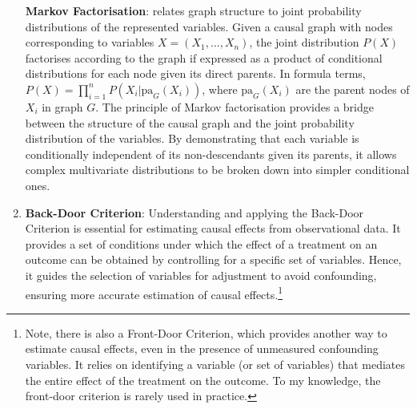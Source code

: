 \documentclass[
  singlecolumn]{report}
\begin{document}
\begin{enumerate}
  \textbf{Markov Factorisation}: relates graph structure to joint
  probability distributions of the represented variables. Given a causal
  graph with nodes corresponding to variables \(X = (X_1, ..., X_n)\),
  the joint distribution \(P(X)\) factorises according to the graph if
  expressed as a product of conditional distributions for each node
  given its direct parents. In formula terms,
  \(P(X) = \prod_{i=1}^{n} P(X_i | \text{pa}_G(X_i))\), where
  \(\text{pa}_G(X_i)\) are the parent nodes of \(X_i\) in graph \(G\).
  The principle of Markov factorisation provides a bridge between the
  structure of the causal graph and the joint probability distribution
  of the variables. By demonstrating that each variable is conditionally
  independent of its non-descendants given its parents, it allows
  complex multivariate distributions to be broken down into simpler
  conditional ones.
\item
  \textbf{Back-Door Criterion}: Understanding and applying the Back-Door
  Criterion is essential for estimating causal effects from
  observational data. It provides a set of conditions under which the
  effect of a treatment on an outcome can be obtained by controlling for
  a specific set of variables. Hence, it guides the selection of
  variables for adjustment to avoid confounding, ensuring more accurate
  estimation of causal effects.\footnote{Note, there is also a
    Front-Door Criterion, which provides another way to estimate causal
    effects, even in the presence of unmeasured confounding variables.
    It relies on identifying a variable (or set of variables) that
    mediates the entire effect of the treatment on the outcome. To my
    knowledge, the front-door criterion is rarely used in practice.}
\end{enumerate}
\end{document}
